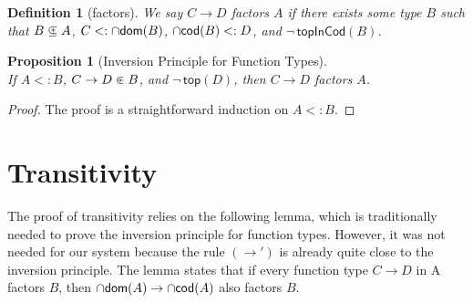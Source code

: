 \documentclass{article}
\newtheorem{proposition}[theorem]{Proposition}
\newtheorem{definition}[theorem]{Definition}
\begin{document}
\begin{definition}[factors]
  We say $C \to D$ \emph{factors} $A$
  if there exists some type $B$ such that
  $B \subsetpluseq A$, $C <: \cap\mathsf{dom}(B)$, $\cap\mathsf{cod}(B) <: D$, and
  $\neg\,\mathsf{topInCod}(B)$.
\end{definition}

\begin{proposition}[Inversion Principle for Function Types]
  \label{prop:⊑-fun-inv}\ \\
  If $A <: B$, $C \to D \inplus B$, and $\neg\,\mathsf{top}(D)$, then
  $C \to D$ factors $A$.
\end{proposition}
\begin{proof}
  The proof is a straightforward induction on $A <: B$.
\end{proof}

\section{Transitivity}
\label{sec:trans}

The proof of transitivity relies on the following lemma, which is
traditionally needed to prove the inversion principle for function
types. However, it was not needed for our system because the rule
$(\to')$ is already quite close to the inversion principle.
The lemma states that if every function type $C \to D$ in A
factors $B$, then $\cap\mathsf{dom}(A) \to \cap\mathsf{cod}(A)$ also factors $B$.
\end{document}
